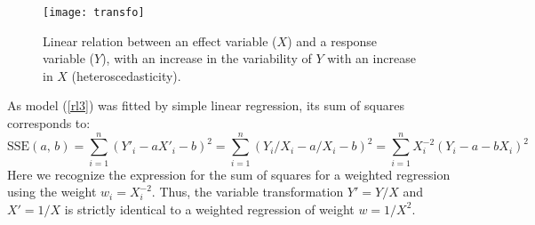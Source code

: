 \begin{figure}[htb]
\begin{center}
\texttt{[image: transfo]}
\end{center}
\caption{Linear relation between an effect variable ($X$) and a response variable ($Y$), with an increase in the variability of $Y$ with an increase in $X$ (heteroscedasticity).\label{linh}}
\end{figure}

As model (\ref{rl3}) was fitted by simple linear regression, its sum of squares corresponds to:
\[
\mathrm{SSE}(a,\,b)=\sum_{i=1}^n(Y'_i-aX'_i-b)^2
=\sum_{i=1}^n(Y_i/X_i-a/X_i-b)^2=\sum_{i=1}^nX_i^{-2}(Y_i-a-bX_i)^2
\]
Here we recognize the expression for the sum of squares for a weighted regression using the weight $w_i=X_i^{-2}$.
Thus, the variable transformation $Y'=Y/X$ and $X'=1/X$ is strictly identical to a weighted regression of
weight $w=1/X^2$.

